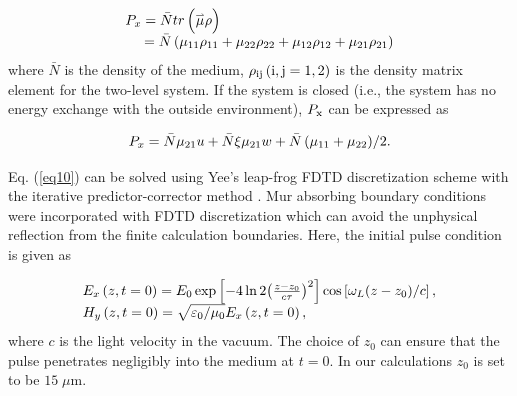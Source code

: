 \documentclass[10pt,letterpaper]{article}
\begin{document}
\begin{equation}
\begin{array}{l}
{P_x} =   \bar{N}tr\left( {\mathord{\buildrel{\lower3pt\hbox{$\scriptscriptstyle\rightharpoonup$}}
		\over \mu } \rho } \right)\\
\;\;\;\;\: =   \bar{N}\left( {{\mu _{11}}{\rho _{11}} + {\mu _{22}}{\rho _{22}} + {\mu _{12}}{\rho _{12}} + {\mu _{21}}{\rho _{21}}} \right)
\end{array}
\label{eq11}
\end{equation}
where $ \bar{N} $ is the density of the medium, ${\rho _{\rm{ij}}}\left( {\rm{i,j} = 1, 2} \right)$  is the density matrix element for the two-level system. If the system is closed (i.e., the system has no energy exchange with the outside environment),  $ P_{\rm{x}} $ can be expressed as

\begin{equation}
{P_x} =   \bar{N}{\mu _{21}}u + \bar{N}\xi {\mu _{21}}w + {{\bar{N}\left( {{\mu _{11}} + {\mu _{22}}} \right)} \mathord{\left/
		{\vphantom {{N\left( {{\mu _{11}} + {\mu _{22}}} \right)} 2}} \right.
		\kern-\nulldelimiterspace} 2}.
\label{eq12}
\end{equation}

Eq. (\ref{eq10}) can be solved using Yee's leap-frog FDTD discretization scheme \cite{Yee} with the iterative predictor-corrector method \cite{Ziolkowski-Two-Level-Method-PRA-1995}. Mur absorbing boundary conditions \cite{Mur-Absorption} were incorporated with FDTD discretization which can avoid the unphysical reflection from the finite calculation boundaries. Here, the initial pulse condition is given as

\begin{equation}
\begin{array}{l}
{E_x}\left( {z,t = 0} \right) = {E_0}\exp \left[ { - 4\ln 2{{\left( {\frac{{z - {z_0}}}{{c\tau }}} \right)}^2}} \right]\cos \left[ {{\omega _L}{{\left( {z - {z_0}} \right)} \mathord{\left/
			{\vphantom {{\left( {z - {z_0}} \right)} c}} \right.
			\kern-\nulldelimiterspace} c}} \right],\\
{H_y}\left( {z,t = 0} \right) = \sqrt {{{{\varepsilon _0}} \mathord{\left/
			{\vphantom {{{\varepsilon _0}} {{\mu _0}}}} \right.
			\kern-\nulldelimiterspace} {{\mu _0}}}} {E_x}\left( {z,t = 0} \right),
\end{array}
\label{eq13}
\end{equation}
where $ c $ is the light velocity in the vacuum. The choice of $ z_{0} $ can ensure that the pulse penetrates negligibly into the medium at $ t=0 $. In our calculations $ z_{0} $ is set to be $15\;\mu$m.
\end{document}
